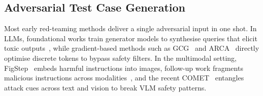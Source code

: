 \documentclass[lettersize,journal]{IEEEtran}
\begin{document}
\subsection{Adversarial Test Case Generation}

Most early red-teaming methods deliver a single adversarial input in one shot.
In LLMs, foundational works train generator models to synthesise queries that elicit toxic outputs~\cite{perez2022red,ganguli2022red}, while gradient-based methods such as GCG~\cite{zou2023universal} and ARCA~\cite{jones2023automatically} directly optimise discrete tokens to bypass safety filters.
In the multimodal setting, FigStep~\cite{gong2025figstep} embeds harmful instructions into images, follow-up work fragments malicious instructions across modalities~\cite{niu2024jailbreaking,shayegani2023jailbreak}, and the recent COMET~\cite{comet2026} entangles attack cues across text and vision to break VLM safety patterns.
\end{document}
